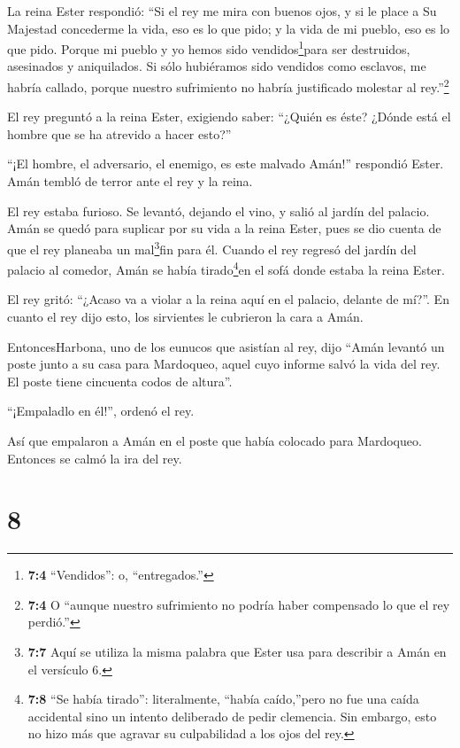  La reina Ester respondió: ``Si el rey me mira con buenos
ojos, y si le place a Su Majestad concederme la vida, eso es lo que
pido; y la vida de mi pueblo, eso es lo que pido.  Porque mi
pueblo y yo hemos sido vendidos\footnote{\textbf{7:4} ``Vendidos'': o,
  ``entregados.''}para ser destruidos, asesinados y aniquilados. Si sólo
hubiéramos sido vendidos como esclavos, me habría callado, porque
nuestro sufrimiento no habría justificado molestar al rey.''\footnote{\textbf{7:4}
  O ``aunque nuestro sufrimiento no podría haber compensado lo que el
  rey perdió.''}

 El rey preguntó a la reina Ester, exigiendo saber: ``¿Quién
es éste? ¿Dónde está el hombre que se ha atrevido a hacer esto?''

 ``¡El hombre, el adversario, el enemigo, es este malvado
Amán!'' respondió Ester. Amán tembló de terror ante el rey y la reina.

 El rey estaba furioso. Se levantó, dejando el vino, y salió
al jardín del palacio. Amán se quedó para suplicar por su vida a la
reina Ester, pues se dio cuenta de que el rey planeaba un
mal\footnote{\textbf{7:7} Aquí se utiliza la misma palabra que Ester usa
  para describir a Amán en el versículo 6.}fin para él. 
Cuando el rey regresó del jardín del palacio al comedor, Amán se había
tirado\footnote{\textbf{7:8} ``Se había tirado'': literalmente, ``había
  caído,''pero no fue una caída accidental sino un intento deliberado de
  pedir clemencia. Sin embargo, esto no hizo más que agravar su
  culpabilidad a los ojos del rey.}en el sofá donde estaba la reina
Ester.

El rey gritó: ``¿Acaso va a violar a la reina aquí en el palacio,
delante de mí?''. En cuanto el rey dijo esto, los sirvientes le
cubrieron la cara a Amán.

 EntoncesHarbona, uno de los eunucos que asistían al rey,
dijo ``Amán levantó un poste junto a su casa para Mardoqueo, aquel cuyo
informe salvó la vida del rey. El poste tiene cincuenta codos de
altura''.

``¡Empaladlo en él!'', ordenó el rey.

 Así que empalaron a Amán en el poste que había colocado
para Mardoqueo. Entonces se calmó la ira del rey.

\hypertarget{section-7}{%
\section{8}\label{section-7}}

